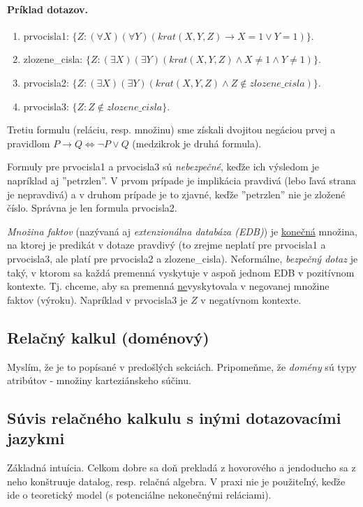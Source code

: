 \documentclass[10pt,a4paper]{article}
\begin{document}
\paragraph{Príklad dotazov.}
\begin{enumerate}
\item prvocisla1: $\{Z : (\forall X) (\forall Y) (krat(X,Y,Z) \rightarrow X = 1 \vee Y = 1)\}$.
\item zlozene\_cisla: $\{Z : (\exists X) (\exists Y) (krat(X,Y,Z) \wedge X \neq 1 \wedge Y \neq 1)\}$.
\item prvocisla2: $\{Z : (\exists X) (\exists Y) (krat(X,Y,Z) \wedge Z \notin zlozene\_cisla) \}$.
\item prvocisla3: $\{Z : Z \notin zlozene\_cisla\}$.
\end{enumerate}
Tretiu formulu (reláciu, resp. množinu) sme získali dvojitou negáciou prvej a pravidlom $P \rightarrow Q \Leftrightarrow \neg P \vee Q$ (medzikrok je druhá formula).

Formuly pre prvocisla1 a prvocisla3 sú \emph{nebezpečné}, keďže ich výsledom je napríklad aj ''petrzlen''.
V prvom prípade je implikácia pravdivá (lebo ľavá strana je nepravdivá) a v druhom prípade je to zjavné, keďže ''petrzlen'' nie je zložené číslo.
Správna je len formula prvocisla2.

\emph{Množina faktov} (nazývaná aj \emph{extenzionálna databáza (EDB)}) je \underline{konečná} množina, na ktorej je predikát v dotaze pravdivý (to zrejme neplatí pre prvocisla1 a prvocisla3, ale platí pre prvocisla2 a zlozene\_cisla).
Neformálne, \emph{bezpečný dotaz} je taký, v ktorom sa každá premenná vyskytuje v aspoň jednom EDB v pozitívnom kontexte. Tj. chceme, aby sa premenná \underline{ne}vyskytovala v negovanej množine faktov (výroku). Napríklad v prvocisla3 je $Z$ v negatívnom kontexte.

\subsection{Relačný kalkul (doménový)}

Myslím, že je to popísané v predošlých sekciách.
Pripomeňme, že \emph{domény} sú typy atribútov - množiny karteziánskeho súčinu.


\subsection{Súvis relačného kalkulu s inými dotazovacími jazykmi}
Základná intuícia. Celkom dobre sa doň prekladá z hovorového a jendoducho sa z neho konštruuje datalog, resp. relačná algebra.
V praxi nie je použiteľný, keďže ide o teoretický model (s potenciálne nekonečnými reláciami).
\end{document}
